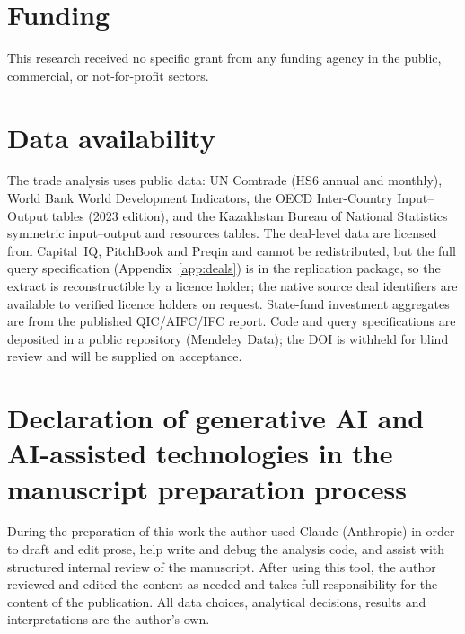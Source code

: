 \documentclass[12pt]{article}
\begin{document}
\section*{Funding}
This research received no specific grant from any funding agency in the public, commercial, or
not-for-profit sectors.

\section*{Data availability}
The trade analysis uses public data: UN Comtrade (HS6 annual and monthly), World Bank World
Development Indicators, the OECD Inter-Country Input--Output tables (2023 edition), and the
Kazakhstan Bureau of National Statistics symmetric input--output and resources tables. The
deal-level data are licensed from Capital~IQ, PitchBook and Preqin and cannot be
redistributed, but the full query specification (Appendix~\ref{app:deals}) is in the replication package, so the extract is reconstructible by a licence holder; the native source deal identifiers are available to verified licence holders on request. State-fund investment aggregates are from the published QIC/AIFC/IFC report.
Code and query specifications are deposited in a public repository (Mendeley Data); the DOI is withheld for blind review and will be supplied on acceptance.

\section*{Declaration of generative AI and AI-assisted technologies in the manuscript preparation process}
During the preparation of this work the author used Claude (Anthropic) in order to draft and
edit prose, help write and debug the analysis code, and assist with structured internal review
of the manuscript. After using this tool, the author reviewed and edited the content as needed
and takes full responsibility for the content of the publication. All data choices, analytical
decisions, results and interpretations are the author's own.




\end{document}
